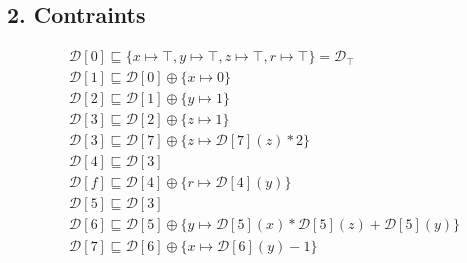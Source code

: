 \documentclass[11pt,a4paper]{scrartcl}
\begin{document}
\begin{minipage}[t]{0.5\textwidth}
\vspace{0pt}
\subsection*{2. Contraints}
\begin{align*}
&\mathcal{D}[0] \sqsubseteq \{x \mapsto \top, y \mapsto \top, z \mapsto \top, r \mapsto \top\} = \mathcal{D}_{\top}\\
&\mathcal{D}[1] \sqsubseteq \mathcal{D}[0] \oplus \{x \mapsto 0\}\\
&\mathcal{D}[2] \sqsubseteq \mathcal{D}[1] \oplus \{y \mapsto 1\}\\
&\mathcal{D}[3] \sqsubseteq \mathcal{D}[2] \oplus \{z \mapsto 1\}\\
&\mathcal{D}[3] \sqsubseteq \mathcal{D}[7] \oplus \{z \mapsto \mathcal{D}[7](z)*2\}\\
&\mathcal{D}[4] \sqsubseteq \mathcal{D}[3]\\
&\mathcal{D}[f] \sqsubseteq \mathcal{D}[4] \oplus \{r \mapsto \mathcal{D}[4](y)\}\\
&\mathcal{D}[5] \sqsubseteq \mathcal{D}[3]\\
&\mathcal{D}[6] \sqsubseteq \mathcal{D}[5] \oplus \{y \mapsto \mathcal{D}[5](x)*\mathcal{D}[5](z)+\mathcal{D}[5](y)\}\\
&\mathcal{D}[7] \sqsubseteq \mathcal{D}[6] \oplus \{x \mapsto \mathcal{D}[6](y)-1\}
\end{align*}
\end{minipage}
\end{document}
